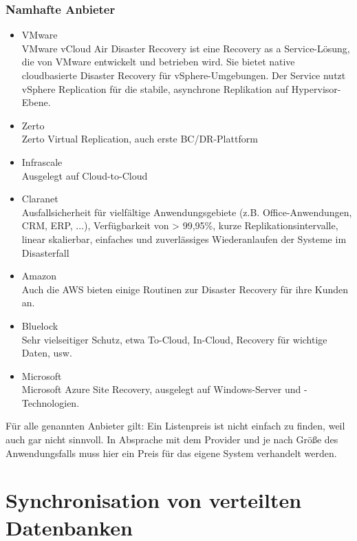 \documentclass[letterpaper, 12pt]{article}
\let\tempsection\section
\renewcommand\section[1]{\vspace{-0.3cm}\tempsection{#1}\vspace{-0.3cm}}
\let\tempsubsubsection\subsubsection
\renewcommand\subsubsection[1]{\vspace{0cm}\tempsubsubsection{#1}\vspace{0cm}}
\begin{document}
\clearpage

\subsubsection{Namhafte Anbieter}

\begin{itemize}
	\item VMware \\
	VMware vCloud Air Disaster Recovery ist eine Recovery as a Service-Lösung, die von VMware entwickelt und betrieben wird. Sie bietet native cloudbasierte Disaster Recovery für vSphere-Umgebungen. Der Service nutzt vSphere Replication für die stabile, asynchrone Replikation auf Hypervisor-Ebene.
	\item Zerto \\
	Zerto Virtual Replication, auch erste BC/DR-Plattform
	\item Infrascale \\
	Ausgelegt auf Cloud-to-Cloud
	\item Claranet \\
	Ausfallsicherheit für vielfältige Anwendungsgebiete (z.B. Office-Anwendungen, CRM, ERP, ...), Verfügbarkeit von > 99,95\%, kurze Replikationsintervalle, linear skalierbar, einfaches und zuverlässiges Wiederanlaufen der Systeme im Disasterfall
	\item Amazon \\
	Auch die AWS bieten einige Routinen zur Disaster Recovery für ihre Kunden an.
	\item Bluelock \\
	Sehr vielseitiger Schutz, etwa To-Cloud, In-Cloud, Recovery für wichtige Daten, usw.
	\item Microsoft \\
	Microsoft Azure Site Recovery, ausgelegt auf Windows-Server und -Technologien.
\end{itemize}

Für alle genannten Anbieter gilt: Ein Listenpreis ist nicht einfach zu finden, weil auch gar nicht sinnvoll. In Absprache mit dem Provider und je nach Größe des Anwendungsfalls muss hier ein Preis für das eigene System verhandelt werden.

\clearpage

\section{Synchronisation von verteilten Datenbanken}
\end{document}

